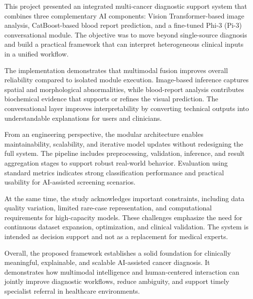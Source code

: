 \documentclass[a4paper,12pt]{report}
\begin{document}
\begin{doublespace} 
This project presented an integrated multi-cancer diagnostic support system that combines three complementary AI components: Vision Transformer-based image analysis, CatBoost-based blood report prediction, and a fine-tuned Phi-3 (Pi-3) conversational module. The objective was to move beyond single-source diagnosis and build a practical framework that can interpret heterogeneous clinical inputs in a unified workflow.

The implementation demonstrates that multimodal fusion improves overall reliability compared to isolated module execution. Image-based inference captures spatial and morphological abnormalities, while blood-report analysis contributes biochemical evidence that supports or refines the visual prediction. The conversational layer improves interpretability by converting technical outputs into understandable explanations for users and clinicians.

From an engineering perspective, the modular architecture enables maintainability, scalability, and iterative model updates without redesigning the full system. The pipeline includes preprocessing, validation, inference, and result aggregation stages to support robust real-world behavior. Evaluation using standard metrics indicates strong classification performance and practical usability for AI-assisted screening scenarios.

At the same time, the study acknowledges important constraints, including data quality variation, limited rare-case representation, and computational requirements for high-capacity models. These challenges emphasize the need for continuous dataset expansion, optimization, and clinical validation. The system is intended as decision support and not as a replacement for medical experts.

Overall, the proposed framework establishes a solid foundation for clinically meaningful, explainable, and scalable AI-assisted cancer diagnosis. It demonstrates how multimodal intelligence and human-centered interaction can jointly improve diagnostic workflows, reduce ambiguity, and support timely specialist referral in healthcare environments.
\end{doublespace} 
\clearpage
\end{document}
